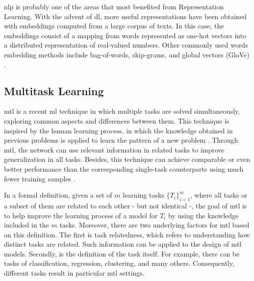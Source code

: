 \acf{nlp} is probably one of the areas that most benefited from Representation Learning. With the advent of \acl{dl}, more useful representations have been obtained with embeddings computed from a large corpus of texts. In this case, the embeddings consist of a mapping from words represented as one-hot vectors into a distributed representation of real-valued numbers. Other commonly used words embedding methods include bag-of-words, skip-grams, and global vectors (GloVe) \citep{pennington2014glove, mikolov2013efficient}.

\subsection{Multitask Learning}

\acf{mtl} is a recent \acl{ml} technique in which multiple tasks are solved simultaneously, exploring common aspects and differences between them. This technique is inspired by the human learning process, in which the knowledge obtained in previous problems is applied to learn the pattern of a new problem \citep{zhang2017survey}. Through \acs{mtl}, the network can use relevant information in related tasks to improve generalization in all tasks. Besides, this technique can achieve comparable or even better performance than the corresponding single-task counterparts using much fewer training samples \citep{domhan2017using, singla2018multi}.

In a formal definition, given a set of $m$ learning tasks $\{T_i\}_{i=1}^m$, where all tasks or a subset of them are related to each other - but not identical -, the goal of \acs{mtl} is to help improve the learning process of a model for $T_i$ by using the knowledge included in the $m$ tasks. Moreover, there are two underlying factors for \acs{mtl} based on this definition. The first is task relatedness, which refers to understanding how distinct tasks are related. Such information can be applied to the design of \acs{mtl} models. Secondly, is the definition of the task itself. For example, there can be tasks of classification, regression, clustering, and many others. Consequently, different tasks result in particular \acs{mtl} settings.

